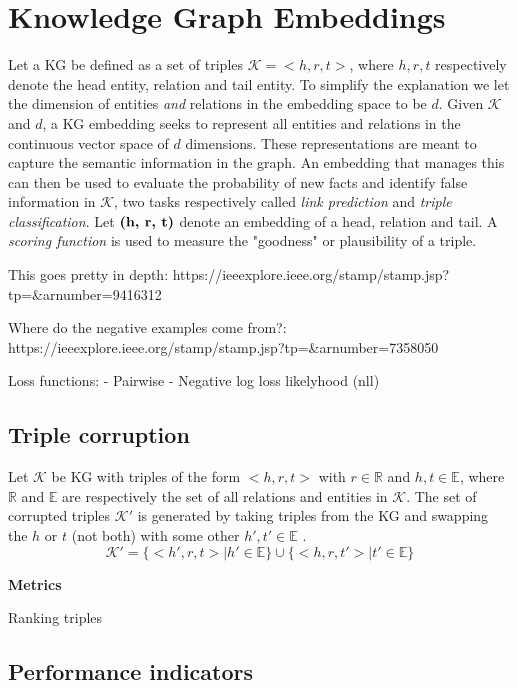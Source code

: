 \section{Knowledge Graph Embeddings}
Let a KG be defined as a set of triples $\mathcal{K}={<h, r, t>}$, where $h, r, t$ respectively denote the head entity, relation and tail entity. To simplify the explanation we let the dimension of entities \emph{and} relations in the embedding space to be $d$.
Given $\mathcal{K}$ and $d$, a KG embedding seeks to represent all entities and relations in the continuous vector space of $d$ dimensions. These representations are meant to capture the semantic information in the graph. An embedding that manages this can then be used to evaluate the probability of new facts and identify false information in $\mathcal{K}$, two tasks respectively called \textit{link prediction} and \textit{triple classification}. Let $\text{\textbf{(h, r, t)}}$ denote an embedding of a head, relation and tail. A \textit{scoring function} is used to measure the "goodness" or plausibility of a triple.

This goes pretty in depth: https://ieeexplore.ieee.org/stamp/stamp.jsp?tp=&arnumber=9416312


Where do the negative examples come from?: https://ieeexplore.ieee.org/stamp/stamp.jsp?tp=&arnumber=7358050


Loss functions:
    - Pairwise
    - Negative log loss likelyhood (nll)
    
\subsection{Triple corruption}
Let $\mathcal{K}$ be KG with triples of the form $<h, r, t>$ with $r\in \mathbb{R}$ and $h, t \in \mathbb{E}$, where $\mathbb{R}$ and $\mathbb{E}$ are respectively the set of all relations and entities in $\mathcal{K}$. The set of corrupted triples $\mathcal{K'}$ is generated by taking triples from the KG and swapping the $h$ or $t$ (not both) with some other $h', t' \in \mathbb{E}$ \cite{TransE}.
\begin{equation}
   \mathcal{K'} =\{<h', r, t> |h' \in \mathbb{E} \} \cup \{<h, r , t'> | t' \in \mathbb{E}\}
\end{equation}



\textbf{Metrics}

    Ranking triples
    
\subsection{Performance indicators}

